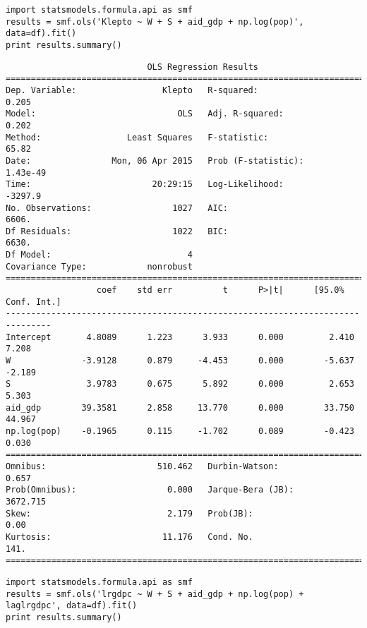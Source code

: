 \documentclass[12pt,fleqn]{article}\usepackage{common}
\begin{document}
\begin{verbatim}
import statsmodels.formula.api as smf
results = smf.ols('Klepto ~ W + S + aid_gdp + np.log(pop)', data=df).fit()
print results.summary()
\end{verbatim}

\begin{verbatim}
                            OLS Regression Results                            
==============================================================================
Dep. Variable:                 Klepto   R-squared:                       0.205
Model:                            OLS   Adj. R-squared:                  0.202
Method:                 Least Squares   F-statistic:                     65.82
Date:                Mon, 06 Apr 2015   Prob (F-statistic):           1.43e-49
Time:                        20:29:15   Log-Likelihood:                -3297.9
No. Observations:                1027   AIC:                             6606.
Df Residuals:                    1022   BIC:                             6630.
Df Model:                           4                                         
Covariance Type:            nonrobust                                         
===============================================================================
                  coef    std err          t      P>|t|      [95.0% Conf. Int.]
-------------------------------------------------------------------------------
Intercept       4.8089      1.223      3.933      0.000         2.410     7.208
W              -3.9128      0.879     -4.453      0.000        -5.637    -2.189
S               3.9783      0.675      5.892      0.000         2.653     5.303
aid_gdp        39.3581      2.858     13.770      0.000        33.750    44.967
np.log(pop)    -0.1965      0.115     -1.702      0.089        -0.423     0.030
==============================================================================
Omnibus:                      510.462   Durbin-Watson:                   0.657
Prob(Omnibus):                  0.000   Jarque-Bera (JB):             3672.715
Skew:                           2.179   Prob(JB):                         0.00
Kurtosis:                      11.176   Cond. No.                         141.
==============================================================================

\end{verbatim}

\begin{verbatim}
import statsmodels.formula.api as smf
results = smf.ols('lrgdpc ~ W + S + aid_gdp + np.log(pop) + laglrgdpc', data=df).fit()
print results.summary()
\end{verbatim}
\end{document}
